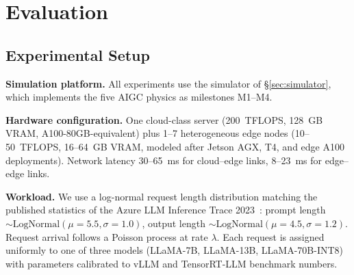 \section{Evaluation}
\label{sec:eval}

\subsection{Experimental Setup}
\label{sec:eval-setup}

\textbf{Simulation platform.} All experiments use the
simulator of \S\ref{sec:simulator}, which implements the five
AIGC physics as milestones M1--M4.

\textbf{Hardware configuration.} One cloud-class server
(200~TFLOPS, 128~GB VRAM, A100-80GB-equivalent) plus 1--7
heterogeneous edge nodes (10--50~TFLOPS, 16--64~GB VRAM,
modeled after Jetson AGX, T4, and edge A100 deployments).
Network latency 30--65~ms for cloud--edge links, 8--23~ms for
edge--edge links.

\textbf{Workload.} We use a log-normal request length
distribution matching the published statistics of the Azure LLM
Inference Trace 2023~\cite{azure2023llmtrace}: prompt length
$\sim \text{LogNormal}(\mu{=}5.5, \sigma{=}1.0)$, output
length $\sim \text{LogNormal}(\mu{=}4.5, \sigma{=}1.2)$.
Request arrival follows a Poisson process at rate $\lambda$.
Each request is assigned uniformly to one of three models
(LLaMA-7B, LLaMA-13B, LLaMA-70B-INT8) with parameters
calibrated to vLLM and TensorRT-LLM benchmark numbers.

